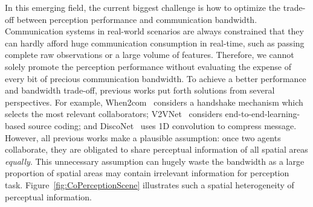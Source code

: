 In this emerging field, the current biggest challenge is how to optimize the trade-off between perception performance and communication bandwidth. Communication systems in real-world scenarios are always constrained that they can hardly afford huge communication consumption in real-time, such as passing complete raw observations or a large volume of features. Therefore, we cannot solely promote the perception performance without evaluating the expense of every bit of precious communication bandwidth. To achieve a better performance and bandwidth trade-off, previous works put forth solutions from several perspectives. For example, When2com~\cite{when2com} considers a handshake mechanism which selects the most relevant collaborators; V2VNet~\cite{v2vnet} considers end-to-end-learning-based source coding; and DiscoNet~\cite{disconet} uses 1D convolution to compress message. However, all previous works make a plausible assumption: once two agents collaborate, they are obligated to share perceptual information of all spatial areas \textit{equally}. This unnecessary assumption can hugely waste the bandwidth as a large proportion of spatial areas may contain irrelevant information for perception task. Figure~\ref{fig:CoPerceptionScene} illustrates such a spatial heterogeneity of perceptual information.


